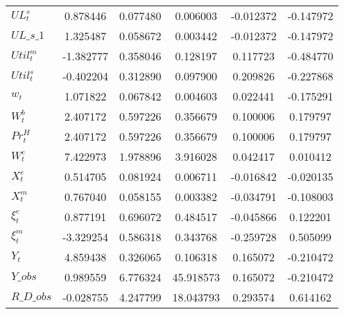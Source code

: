 \begin{center}
\begin{longtable}{lccccc}
$  UL^s_t                   $	 & 	        0.878446	 & 	        0.077480	 & 	        0.006003	 & 	       -0.012372	 & 	       -0.147972 \\ 
$UL\_s\_1                   $	 & 	        1.325487	 & 	        0.058672	 & 	        0.003442	 & 	       -0.012372	 & 	       -0.147972 \\ 
$ Util^m_t                  $	 & 	       -1.382777	 & 	        0.358046	 & 	        0.128197	 & 	        0.117723	 & 	       -0.484770 \\ 
$  Util^s_t                 $	 & 	       -0.402204	 & 	        0.312890	 & 	        0.097900	 & 	        0.209826	 & 	       -0.227868 \\ 
$ w_t                       $	 & 	        1.071822	 & 	        0.067842	 & 	        0.004603	 & 	        0.022441	 & 	       -0.175291 \\ 
$ W^b_t                     $	 & 	        2.407172	 & 	        0.597226	 & 	        0.356679	 & 	        0.100006	 & 	        0.179797 \\ 
$ Pr^H_t                    $	 & 	        2.407172	 & 	        0.597226	 & 	        0.356679	 & 	        0.100006	 & 	        0.179797 \\ 
$ W^e_t                     $	 & 	        7.422973	 & 	        1.978896	 & 	        3.916028	 & 	        0.042417	 & 	        0.010412 \\ 
$ X^e_t                     $	 & 	        0.514705	 & 	        0.081924	 & 	        0.006711	 & 	       -0.016842	 & 	       -0.020135 \\ 
$ X^m_t                     $	 & 	        0.767040	 & 	        0.058155	 & 	        0.003382	 & 	       -0.034791	 & 	       -0.108003 \\ 
$ \xi^e_t                   $	 & 	        0.877191	 & 	        0.696072	 & 	        0.484517	 & 	       -0.045866	 & 	        0.122201 \\ 
$  \xi^m_t                  $	 & 	       -3.329254	 & 	        0.586318	 & 	        0.343768	 & 	       -0.259728	 & 	        0.505099 \\ 
$ Y_t                       $	 & 	        4.859438	 & 	        0.326065	 & 	        0.106318	 & 	        0.165072	 & 	       -0.210472 \\ 
$Y\_obs                     $	 & 	        0.989559	 & 	        6.776324	 & 	       45.918573	 & 	        0.165072	 & 	       -0.210472 \\ 
$R\_D\_obs                  $	 & 	       -0.028755	 & 	        4.247799	 & 	       18.043793	 & 	        0.293574	 & 	        0.614162 \\ 

\end{longtable}
\end{center}

